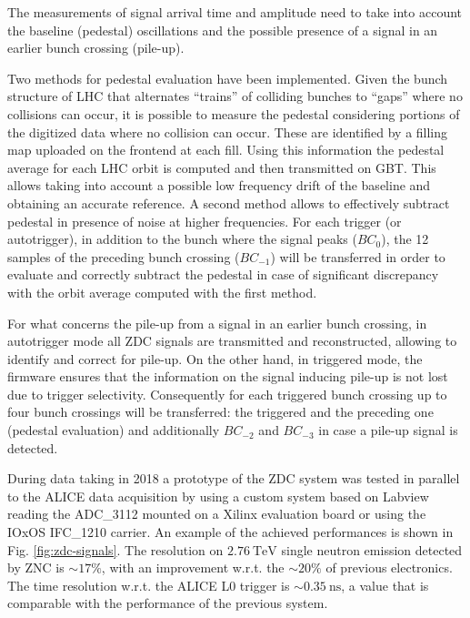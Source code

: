The measurements of signal arrival time and amplitude need to take into account the baseline (pedestal) oscillations and the possible presence of a signal in an earlier bunch crossing (pile-up).

Two methods for pedestal evaluation have been implemented. Given the bunch structure of LHC that alternates ``trains'' of colliding bunches to ``gaps'' where no collisions can occur, it is possible to measure the pedestal considering portions of the digitized data where no collision can occur. These are identified by a filling map uploaded on the frontend at each fill. Using this information the pedestal average for each LHC orbit is computed and then transmitted on GBT. This allows taking into account a possible low frequency drift of the baseline and obtaining an accurate reference. A second method allows to effectively subtract pedestal in presence of noise at higher frequencies. For each trigger (or autotrigger), in addition to the bunch where the signal peaks ($BC_0$), the 12 samples of the preceding bunch crossing ($BC_{-1}$) will be transferred in order to evaluate and correctly subtract the pedestal in case of significant discrepancy with the orbit average computed with the first method.

For what concerns the pile-up from a signal in an earlier bunch crossing, in autotrigger mode all ZDC signals are transmitted and reconstructed, allowing to identify and correct for pile-up. On the other hand, in triggered mode, the firmware ensures that the information on the signal inducing pile-up is not lost due to trigger selectivity. Consequently for each triggered bunch crossing up to four bunch crossings will be transferred: the triggered and the preceding one (pedestal evaluation) and additionally $BC_{-2}$ and $BC_{-3}$ in case a pile-up signal is detected.

During \PbPb data taking in 2018 a prototype of the ZDC system was tested in parallel to the ALICE data acquisition by using a custom system based on Labview reading the ADC\_3112 mounted on a Xilinx evaluation board or using the IOxOS IFC\_1210 carrier. An example of the achieved performances is shown in Fig. \ref{fig:zdc-signals}. The resolution on $\SI{2.76}{\tera\electronvolt}$ single neutron emission detected by ZNC is $\sim17\%$, with an improvement w.r.t. the $\sim20\%$ of previous electronics. The time resolution w.r.t. the ALICE L0 trigger is $\sim\SI{0.35}{\nano\second}$, a value that is comparable with the performance of the previous system.

